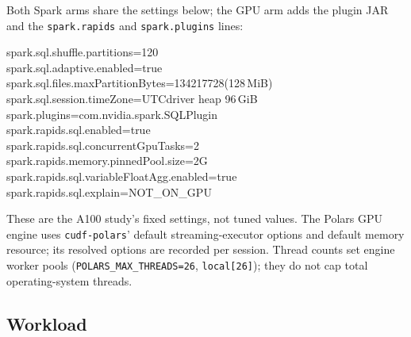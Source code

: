 \documentclass[11pt]{article}
\begin{document}
Both Spark arms share the settings below; the GPU arm adds the plugin JAR
and the \texttt{spark.rapids} and \texttt{spark.plugins} lines:
\begin{flushleft}\small\ttfamily
spark.sql.shuffle.partitions=120\\
spark.sql.adaptive.enabled=true\\
spark.sql.files.maxPartitionBytes=134217728\quad\rmfamily(128\,MiB)\ttfamily\\
spark.sql.session.timeZone=UTC\quad\rmfamily driver heap 96\,GiB\ttfamily\\[2pt]
spark.plugins=com.nvidia.spark.SQLPlugin\\
spark.rapids.sql.enabled=true\\
spark.rapids.sql.concurrentGpuTasks=2\\
spark.rapids.memory.pinnedPool.size=2G\\
spark.rapids.sql.variableFloatAgg.enabled=true\\
spark.rapids.sql.explain=NOT\_ON\_GPU
\end{flushleft}
These are the A100 study's fixed settings, not tuned values. The Polars GPU engine uses
\texttt{cudf-polars}' default streaming-executor options and default memory
resource; its resolved options are recorded per session. Thread counts set
engine worker pools (\texttt{POLARS\_MAX\_THREADS=26}, \texttt{local[26]});
they do not cap total operating-system threads.

\subsection{Workload}
\label{sec:workload}
\end{document}
